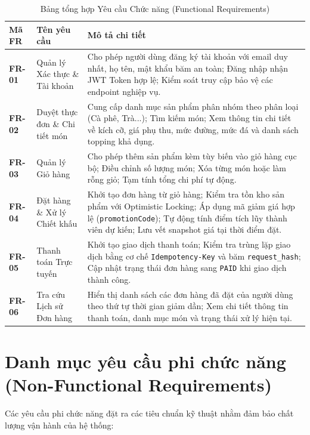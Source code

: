 \begin{table}[htbp]
\centering
\caption{Bảng tổng hợp Yêu cầu Chức năng (Functional Requirements)}
\label{tab:functional-requirements}
\begin{tabularx}{\textwidth}{lp{3.5cm}X}
\toprule
\textbf{Mã FR} & \textbf{Tên yêu cầu} & \textbf{Mô tả chi tiết} \\
\midrule
\textbf{FR-01} & Quản lý Xác thực \& Tài khoản & Cho phép người dùng đăng ký tài khoản với email duy nhất, họ tên, mật khẩu băm an toàn; Đăng nhập nhận JWT Token hợp lệ; Kiểm soát truy cập bảo vệ các endpoint nghiệp vụ. \\
\textbf{FR-02} & Duyệt thực đơn \& Chi tiết món & Cung cấp danh mục sản phẩm phân nhóm theo phân loại (Cà phê, Trà...); Tìm kiếm món; Xem thông tin chi tiết về kích cỡ, giá phụ thu, mức đường, mức đá và danh sách topping khả dụng. \\
\textbf{FR-03} & Quản lý Giỏ hàng & Cho phép thêm sản phẩm kèm tùy biến vào giỏ hàng cục bộ; Điều chỉnh số lượng món; Xóa từng món hoặc làm rỗng giỏ; Tạm tính tổng chi phí tự động. \\
\textbf{FR-04} & Đặt hàng \& Xử lý Chiết khấu & Khởi tạo đơn hàng từ giỏ hàng; Kiểm tra tồn kho sản phẩm với Optimistic Locking; Áp dụng mã giảm giá hợp lệ (\texttt{promotionCode}); Tự động tính điểm tích lũy thành viên dự kiến; Lưu vết snapshot giá tại thời điểm đặt. \\
\textbf{FR-05} & Thanh toán Trực tuyến & Khởi tạo giao dịch thanh toán; Kiểm tra trùng lặp giao dịch bằng cơ chế \texttt{Idempotency-Key} và băm \texttt{request\_hash}; Cập nhật trạng thái đơn hàng sang \texttt{PAID} khi giao dịch thành công. \\
\textbf{FR-06} & Tra cứu Lịch sử Đơn hàng & Hiển thị danh sách các đơn hàng đã đặt của người dùng theo thứ tự thời gian giảm dần; Xem chi tiết thông tin thanh toán, danh mục món và trạng thái xử lý hiện tại. \\
\bottomrule
\end{tabularx}
\end{table}

\section{Danh mục yêu cầu phi chức năng (Non-Functional Requirements)}
Các yêu cầu phi chức năng đặt ra các tiêu chuẩn kỹ thuật nhằm đảm bảo chất lượng vận hành của hệ thống:

